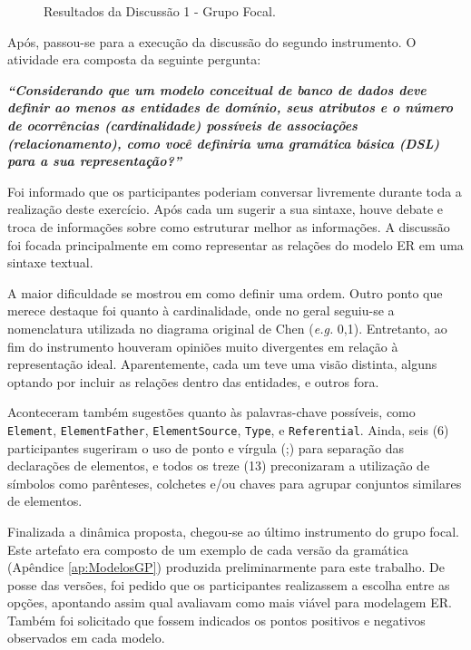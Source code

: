 \begin{figure}[!htb]
    \centering
    \caption{Resultados da Discussão 1 - Grupo Focal.}
    \label{fig:disc1GPfocalGrafico}
    
\end{figure}

Após, passou-se para a execução da discussão do segundo instrumento.
O atividade era composta da seguinte pergunta:

\textit{\textbf{``Considerando que um modelo conceitual de banco de dados deve definir ao menos as entidades de domínio, seus atributos e o número de ocorrências (cardinalidade) possíveis de associações (relacionamento), como você definiria uma gramática básica (DSL) para a sua representação?''}}

Foi informado que os participantes poderiam conversar livremente durante toda a realização deste exercício.
Após cada um sugerir a sua sintaxe, houve debate e troca de informações sobre como estruturar melhor as informações. 
A discussão foi focada principalmente em como representar as relações do modelo \ac{ER} em uma sintaxe textual. 

A maior dificuldade se mostrou em como definir uma ordem. 
Outro ponto que merece destaque foi quanto à cardinalidade, onde no geral seguiu-se a nomenclatura utilizada no diagrama original de Chen (\textit{e.g.} 0,1). 
Entretanto, ao fim do instrumento houveram opiniões muito divergentes em relação à representação ideal. 
Aparentemente, cada um teve uma visão distinta, alguns optando por incluir as relações dentro das entidades, e outros fora. 

Aconteceram também sugestões quanto às palavras-chave possíveis, como \texttt{Element}, \texttt{ElementFather}, \texttt{ElementSource}, \texttt{Type}, e \texttt{Referential}.
Ainda, seis (6) participantes sugeriram o uso de ponto e vírgula (;) para separação das declarações de elementos, e todos os treze (13) preconizaram a utilização de símbolos como parênteses, colchetes e/ou chaves para agrupar conjuntos similares de elementos.				

Finalizada a dinâmica proposta, chegou-se ao último instrumento do grupo focal.
Este artefato era composto de um exemplo de cada versão da gramática (Apêndice \ref{ap:ModelosGP}) produzida preliminarmente para este trabalho.
De posse das versões, foi pedido que os participantes realizassem a escolha entre as opções, apontando assim qual avaliavam como mais viável para modelagem \ac{ER}.
Também foi solicitado que fossem indicados os pontos positivos e negativos observados em cada modelo.

